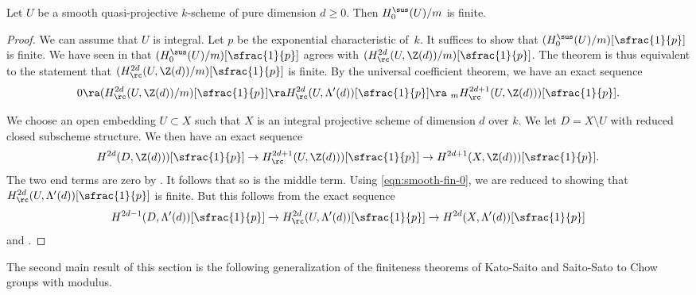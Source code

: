 \begin{thm}\label{thm:smooth-fin}
Let $U$ be a smooth quasi-projective $k$-scheme of pure dimension $d \ge 0$.
Then ${H^{\sus}_0(U)}/m$ is finite.
\end{thm}
\begin{proof}
We can assume that $U$ is integral.
Let $p$ be the exponential characteristic of~$k$.
It suffices to show that $({H^{\sus}_0(U)}/m)[\sfrac{1}{p}]$ is finite.
We have seen in  that
$({H^{\sus}_0(U)}/m)[\sfrac{1}{p}]$ agrees with
$({H^{2d}_\rc(U, \Z(d))}/m)[\sfrac{1}{p}]$.
The theorem is thus equivalent to the statement that
$({H^{2d}_\rc(U, \Z(d))}/m)[\sfrac{1}{p}]$ is finite.
By the universal coefficient theorem, we have an exact sequence
\begin{equation}\label{eqn:smooth-fin-0}
0 \ra ({H^{2d}_\rc(U, \Z(d))}/m)[\sfrac{1}{p}]
\ra H^{2d}_\rc(U, \Lambda'(d))[\sfrac{1}{p}] \ra~_mH^{2d+1}_\rc(U, \Z(d)))[\sfrac{1}{p}].
\end{equation}

We choose an open embedding $U \subset X$ such that $X$ is an integral
projective scheme of dimension $d$ over $k$. We let $D = X \setminus U$
with reduced closed subscheme structure.
We then have an exact sequence
\[
H^{2d}(D, \Z(d)))[\sfrac{1}{p}] \to H^{2d+1}_\rc(U, \Z(d)))[\sfrac{1}{p}] \to
H^{2d+1}(X, \Z(d)))[\sfrac{1}{p}].
\]
The two end terms are zero by \cite[Th.\,5.1]{KP}. It follows that so is the
middle term. Using \eqref{eqn:smooth-fin-0},
we are reduced to showing that
$H^{2d}_\rc(U, \Lambda'(d))[\sfrac{1}{p}]$ is finite.
But this follows from the exact sequence
\[
H^{2d-1}(D, \Lambda'(d))[\sfrac{1}{p}] \to
H^{2d}_\rc(U, \Lambda'(d))[\sfrac{1}{p}] \to H^{2d}(X, \Lambda'(d))[\sfrac{1}{p}]
\]
and .
\end{proof}

The second main result of this section is the following generalization of the
finiteness theorems of Kato-Saito \cite{Kato-Saito-1} and Saito-Sato
\cite{SaitoSatoAnnals} to Chow groups with modulus.

